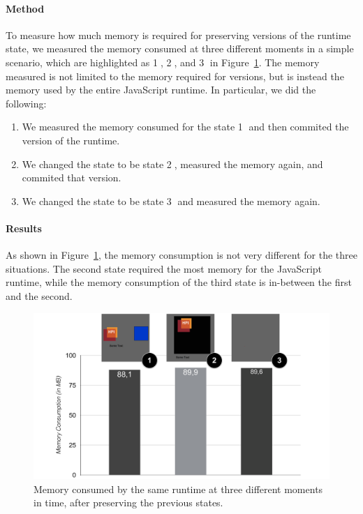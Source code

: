 \paragraph{Method}
To measure how much memory is required for preserving versions of the runtime state, we measured the memory consumed at three different moments in a simple scenario, which are highlighted as \textcircled{1}, \textcircled{2}, and \textcircled{3} in Figure~\ref{fig:MemoryOverheadForVersions}.
The memory measured is not limited to the memory required for versions, but is instead the memory used by the entire JavaScript runtime.
In particular, we did the following:
\begin{enumerate}
    \item We measured the memory consumed for the state \textcircled{1} and then commited the version of the runtime.
    \item We changed the state to be state \textcircled{2}, measured the memory again, and commited that version.
    \item We changed the state to be state \textcircled{3} and measured the memory again.
\end{enumerate}

\paragraph{Results}
As shown in Figure~\ref{fig:MemoryOverheadForVersions}, the memory consumption is not very different for the three situations.
The second state required the most memory for the JavaScript runtime, while the memory consumption of the third state is in-between the first and the second.

\begin{figure}[h]
    \centering
    \includegraphics[width=\textwidth]{figures/6_evaluation/2_memoryForVersions.pdf}
    \caption{Memory consumed by the same runtime at three different moments in time, after preserving the previous states.}
    \label{fig:MemoryOverheadForVersions}
\end{figure}


